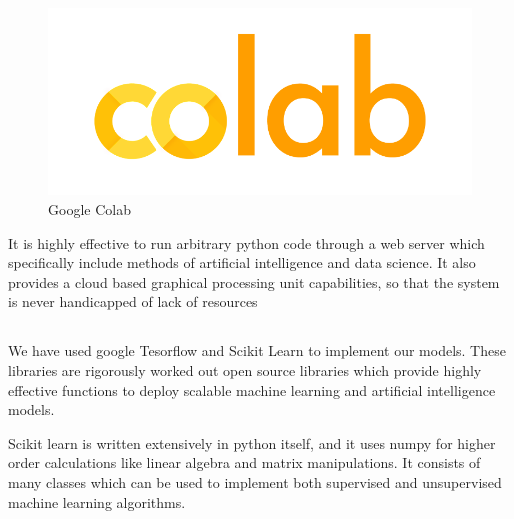 \documentclass[12pt]{article}
\newcommand{\nd}{\noindent}
\newcommand{\subsize}{\fontsize{14pt}{12pt}\selectfont}
\begin{document}
\begin{center}
\begin{figure}[h]
\centerline{\includegraphics[scale=.35]{colab2.png}}
\caption{Google Colab}
\end{figure}
\end{center}
 

\nd It is highly effective to run arbitrary python code through a web server which specifically include methods of artificial intelligence and data science. It also provides a cloud based graphical processing unit capabilities, so that the system is never handicapped of lack of resources
\newpage
\subsection{\textbf{\subsize{LIBRARIES AND DEPENDENCIES}}}
We have used google Tesorflow and Scikit Learn to implement our models. These libraries are rigorously worked out open source libraries which provide highly effective functions to deploy scalable machine learning and artificial intelligence models. 

\nd Scikit learn is written extensively in python itself, and it uses numpy for higher order calculations like linear algebra and matrix manipulations. It consists of many classes which can be used to implement both supervised and unsupervised machine learning algorithms. 
\vspace{10mm}
\end{document}
